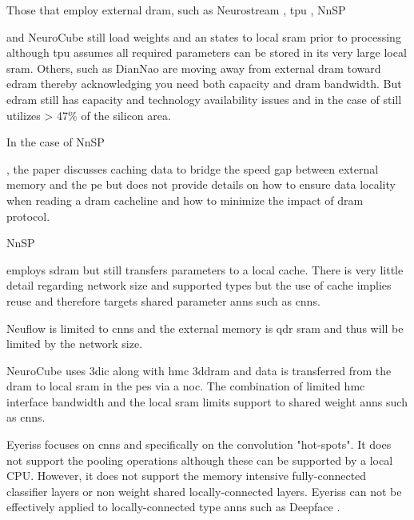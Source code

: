 Those that employ external \ac{dram}, such as Neurostream \cite{azarkhish2017neurostream}, \ac{tpu} \cite{tensorflow2015-whitepaper}, NnSP{\cite{esmaeilzadeh2005nnsp} and NeuroCube\cite{kim2016neurocube} still 
load weights and \ac{an} states to local \ac{sram} prior to processing although \ac{tpu} assumes all required parameters can be stored in its very large local \ac{sram}.
Others, such as DianNao \cite{chen2016diannao} are moving away from external \ac{dram} toward \ac{edram} thereby acknowledging you need both capacity and \ac{dram} bandwidth. 
But \ac{edram} still has capacity and technology availability issues and in the case of \cite{dadiannao2017} still utilizes > 47\% of the silicon area.

In the case of NnSP{\cite{esmaeilzadeh2005nnsp}, the paper discusses caching data to bridge the speed gap between external memory and the \ac{pe} 
but does not provide details on how to ensure data locality when reading a \ac{dram} cacheline and how to minimize the impact of \ac{dram} protocol.

NnSP {\cite{esmaeilzadeh2005nnsp} employs \ac{sdram} but still transfers parameters to a local cache.
There is very little detail regarding network size and supported types but the use of cache implies reuse and therefore targets shared parameter \acp{ann} such as \acp{cnn}.

Neuflow\cite{farabet2011neuflow} is limited to \acp{cnn} and the external memory is \ac{qdr} \ac{sram} 
and thus will be limited by the network size.

NeuroCube uses \ac{3dic} along with \ac{hmc} \ac{3ddram} and data is transferred from the \ac{dram} to local \ac{sram} in the \acp{pe} via a \ac{noc}.
The combination of limited \ac{hmc} interface bandwidth and the local \ac{sram} limits support to shared weight \acp{ann} such as \acp{cnn}.

Eyeriss\cite{chen201614} focuses on \acp{cnn} and specifically on the convolution "hot-spots". It does not support the pooling operations although these can
be supported by a local CPU.  However, it does not support the memory intensive fully-connected classifier layers or non weight shared locally-connected layers.
Eyeriss can not be effectively applied to locally-connected type \acp{ann} such as Deepface \cite{Taigman_2014_CVPR}.

}}}
